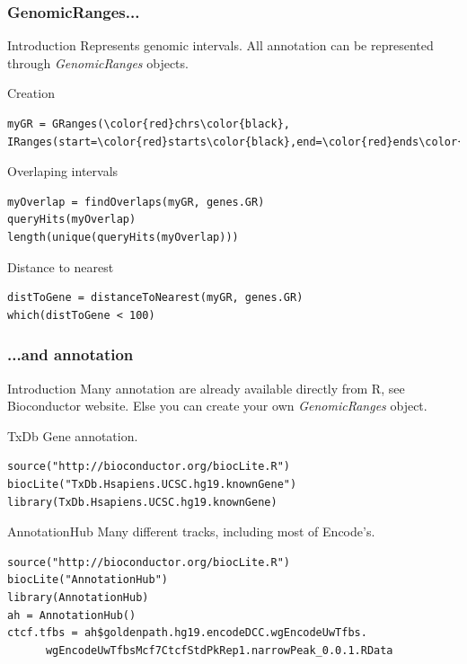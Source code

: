 \documentclass[10pt]{beamer}
\newenvironment{xframe}[2][]
  {\begin{frame}[fragile,environment=xframe,#1]
  \frametitle{#2}}
  {\end{frame}}
\begin{document}
\begin{xframe}{GenomicRanges...}
  \begin{block}{Introduction}
    Represents genomic intervals. All annotation can be represented through {\it GenomicRanges} objects.
  \end{block}
  \begin{block}{Creation}
\begin{Verbatim}[commandchars=\\\{\}]
myGR = GRanges(\color{red}chrs\color{black}, IRanges(start=\color{red}starts\color{black},end=\color{red}ends\color{black}))
\end{Verbatim}      
  \end{block}
  \begin{block}{Overlaping intervals}
\begin{verbatim}
myOverlap = findOverlaps(myGR, genes.GR)
queryHits(myOverlap)
length(unique(queryHits(myOverlap)))
\end{verbatim}      
  \end{block}
  \begin{block}{Distance to nearest}
\begin{verbatim}
distToGene = distanceToNearest(myGR, genes.GR)
which(distToGene < 100)
\end{verbatim}      
  \end{block}
\end{xframe}


\begin{xframe}[shrink=10]{...and annotation}
  \begin{block}{Introduction}
    Many annotation are already available directly from R, see Bioconductor website. Else you can create your own {\it GenomicRanges} object.
  \end{block}
  \begin{block}{TxDb}
    Gene annotation.
\begin{verbatim}
source("http://bioconductor.org/biocLite.R")
biocLite("TxDb.Hsapiens.UCSC.hg19.knownGene")
library(TxDb.Hsapiens.UCSC.hg19.knownGene)
\end{verbatim}      
  \end{block}
  \begin{block}{AnnotationHub}
    Many different tracks, including most of Encode's.
\begin{verbatim}
source("http://bioconductor.org/biocLite.R")
biocLite("AnnotationHub")
library(AnnotationHub)
ah = AnnotationHub()
ctcf.tfbs = ah$goldenpath.hg19.encodeDCC.wgEncodeUwTfbs.
      wgEncodeUwTfbsMcf7CtcfStdPkRep1.narrowPeak_0.0.1.RData
\end{verbatim}      
\end{block}
\end{xframe}
\end{document}
